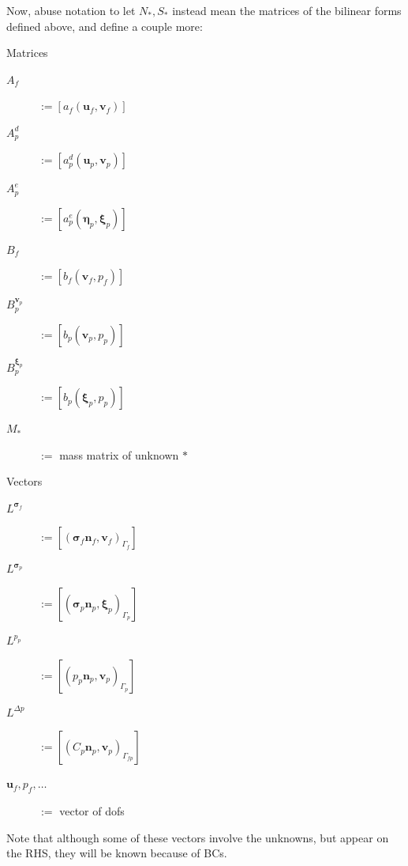 \documentclass{article}
\newcommand{\mathspace}[1]{\ensuremath{#1}\xspace} %
\newcommand{\sigmabf}{\mathspace{\boldsymbol{\sigma}}}
\newcommand{\inner}[2]{\mathspace{\left (#1, #2 \right)}}
\newcommand{\defeq}{\mathspace{:=}}
\newcommand{\matrixform}[1]{\mathspace{\left [ #1 \right ]}}
\newcommand{\stokesbdy}{\mathspace{\Gamma_{f}}}
\newcommand{\darcybdy}{\mathspace{\Gamma_{p}}}
\newcommand{\interface}{\mathspace{\Gamma_{fp}}}
\newcommand{\nf}{\mathspace{\mathbf{n}_f}}
\newcommand{\np}{\mathspace{\mathbf{n}_p}}
\newcommand{\uf}{\mathspace{\mathbf{u}_f}}
\newcommand{\vf}{\mathspace{\mathbf{v}_f}}
\newcommand{\up}{\mathspace{\mathbf{u}_p}}
\newcommand{\vp}{\mathspace{\mathbf{v}_p}}
\newcommand{\pf}{\mathspace{p_f}}
\newcommand{\pp}{\mathspace{p_p}}
\newcommand{\disp}{\mathspace{\boldsymbol{\eta}_p}}
\newcommand{\disptest}{\mathspace{\boldsymbol{\xi}_p}}
\begin{document}
Now, abuse notation to let $N_*, S_*$ instead mean the matrices of the bilinear forms defined above, and define a couple more:
\begin{center}
  \begin{multicols}{2}
    Matrices
\begin{description}
\item[$A_f$] \defeq \matrixform{a_f(\uf, \vf)}
\item[$A^d_p$]\defeq  \matrixform{a_p^d(\up, \vp)}
\item[$A^e_p$]\defeq  \matrixform{a_p^e(\disp, \disptest)}
\item[$B_f$]\defeq  \matrixform{b_f(\vf, \pf)}
\item[$B^{\vp}_p$]\defeq  \matrixform{b_p(\vp, \pp)}
\item[$B^{\disptest}_p$]\defeq  \matrixform{b_p(\disptest, \pp)}
\item[$M_*$] \defeq mass matrix of unknown $* $
\end{description}
\columnbreak
Vectors
\begin{description}
\item[$L^{\sigmabf_f}$] \defeq \matrixform{\inner{\sigmabf_f \nf}{\vf}_{\stokesbdy}}
\item[$L^{\sigmabf_p}$] \defeq \matrixform{\inner{\sigmabf_p \np}{\disptest}_{\darcybdy}}
\item[$L^{\pp}$] \defeq \matrixform{\inner{\pp \np}{\vp}_{\darcybdy}}
\item[$L^{\Delta p}$] \defeq \matrixform{\inner{C_p\np}{\vp}_{\interface}}
\item[$\uf, \pf, \ldots$] \defeq vector of dofs
  
\end{description}

\end{multicols}
\end{center}
Note that although some of these vectors involve the unknowns, but appear on the RHS, they will be known because of BCs.
\end{document}
